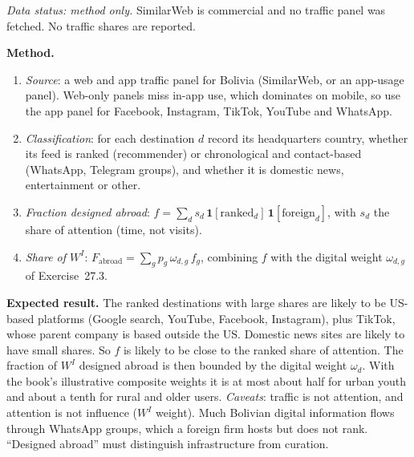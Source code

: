 \documentclass[../solutions_manual.tex]{subfiles}
\begin{document}

\emph{Data status: method only.} SimilarWeb is commercial and no traffic panel was fetched. No traffic shares are reported.

 \textbf{Method.}
\begin{enumerate}
\item \emph{Source}: a web and app traffic panel for Bolivia (SimilarWeb, or an app-usage panel). Web-only panels miss in-app use, which dominates on mobile, so use the app panel for Facebook, Instagram, TikTok, YouTube and WhatsApp.
\item \emph{Classification}: for each destination $d$ record its headquarters country, whether its feed is ranked (recommender) or chronological and contact-based (WhatsApp, Telegram groups), and whether it is domestic news, entertainment or other.
\item \emph{Fraction designed abroad}: $f = \sum_d s_d\,\mathbf{1}[\text{ranked}_d]\,\mathbf{1}[\text{foreign}_d]$, with $s_d$ the share of attention (time, not visits).
\item \emph{Share of $W^I$}: $F_{\text{abroad}} = \sum_g p_g\,\omega_{d,g}\,f_g$, combining $f$ with the digital weight $\omega_{d,g}$ of Exercise~27.3.
\end{enumerate}

 \textbf{Expected result.} The ranked destinations with large shares are likely to be US-based platforms (Google search, YouTube, Facebook, Instagram), plus TikTok, whose parent company is based outside the US. Domestic news sites are likely to have small shares. So $f$ is likely to be close to the ranked share of attention. The fraction of $W^I$ designed abroad is then bounded by the digital weight $\omega_d$. With the book's illustrative composite weights it is at most about half for urban youth and about a tenth for rural and older users. \emph{Caveats}: traffic is not attention, and attention is not influence ($W^I$ weight). Much Bolivian digital information flows through WhatsApp groups, which a foreign firm hosts but does not rank. ``Designed abroad'' must distinguish infrastructure from curation.

\end{document}
